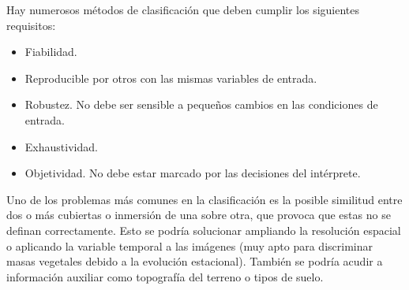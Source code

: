 Hay numerosos métodos de clasificación que deben cumplir los siguientes requisitos:

\begin{itemize}
	\item Fiabilidad.
	\item Reproducible por otros con las mismas variables de entrada.
	\item Robustez. No debe ser sensible a pequeños cambios en las condiciones de entrada.
	\item Exhaustividad.
	\item Objetividad. No debe estar marcado por las decisiones del intérprete.
\end{itemize}

Uno de los problemas más comunes en la clasificación es la posible similitud entre dos o más cubiertas o inmersión de una sobre otra, que provoca que estas no se definan correctamente. Esto se podría solucionar ampliando la resolución espacial o aplicando la variable temporal a las imágenes (muy apto para discriminar masas vegetales debido a la evolución estacional). También se podría acudir a información auxiliar como topografía del terreno o tipos de suelo.

